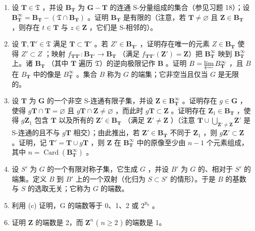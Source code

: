\begin{enumerate}
\def\labelenumi{(\alph{enumi})}
\item
  设 \(\mathbf{T} \in \mathfrak{T}\) ，并设 \(\mathbf{B}_{\mathbf{T}}\) 为 \(\mathbf{G} - \mathbf{T}\) 的连通 S-分量组成的集合（参见习题 18）；设 \(\mathbf{B}_{\mathbf{T}}^{\infty} = \mathbf{B}_{\mathbf{T}} - (\mathfrak{T} \cap \mathbf{B}_{\mathbf{T}})\) 。证明 \(\mathbf{B}_{\mathbf{T}}\) 是有限的（注意，若 \(\mathbf{T} \neq \varnothing\) 且 \(\mathbf{Z} \in \mathbf{B}_{\mathbf{T}}\) ，则存在 \(t \in \mathbf{T}\) 与 \(z \in \mathbf{Z}\) ，它们是 S-相邻的）。
\item
  设 \(\mathbf{T}, \mathbf{T}' \in \mathfrak{T}\) 满足 \(\mathbf{T} \subset \mathbf{T}'\) 。若 \(Z' \in \mathbf{B}_{\mathbf{T}'}\) ，证明存在唯一的元素 \(Z \in \mathbf{B}_{\mathbf{T}}\) 使得 \(Z' \subset Z\) ；映射 \(f_{\mathbf{T}\mathbf{T}'}: \mathbf{B}_{\mathbf{T}'} \to \mathbf{B}_{\mathbf{T}}\) （满足 \(f_{\mathbf{T}\mathbf{T}'}(\mathbf{Z}') = \mathbf{Z}\)）把 \(\mathbf{B}_{\mathbf{T}}^{\infty}\) 映到 \(\mathbf{B}_{\mathbf{T}}^{\infty}\) 上。诸 \(\mathbf{B}_{\mathbf{T}}\) （其中 \(\mathbf{T}\) 遍历 \(\mathfrak{T}\)）的逆向极限记作 \(\mathbf{B}\) 。证明 \(B = \varprojlim B_{\mathbf{T}}^{\infty}\) ，且 \(B\) 在 \(B_{\mathbf{T}}\) 中的像是 \(B_{\mathbf{T}}^{\infty}\) 。集合 \(B\) 称为 \(G\) 的端集；它非空当且仅当 \(G\) 是无限的。
\item
  设 \(\mathbf{T}\) 为 \(\mathbf{G}\) 的一个非空 S-连通有限子集，并设 \(\mathbf{Z} \in \mathbf{B}_{\mathbf{T}}^{\infty}\) 。证明存在 \(g \in \mathbf{G}\) ，使得 \(g\mathbf{T} \cap \mathbf{T} = \varnothing\) 且 \(g\mathbf{T} \cap \mathbf{Z} \neq \varnothing\) ，而此时 \(g\mathbf{T} \subset \mathbf{Z}\) 。证明存在 \(\mathbf{Z}_1 \in \mathbf{B}_{\mathbf{T}}\) ，使得 \(g\mathbf{Z}_1\) 包含 \(\mathbf{T}\) 以及所有的 \(\mathbf{Z}' \in \mathbf{B}_{\mathbf{T}}\) （满足 \(\mathbf{Z}' \neq \mathbf{Z}\) ）（注意 \(\mathbf{T} \cup \bigcup_{\mathbf{Z}' \neq \mathbf{Z}} \mathbf{Z}'\) 是 S-连通的且不与 \(g\mathbf{T}\) 相交）；由此推出，若 \(\mathbf{Z}' \in \mathbf{B}_{\mathbf{T}}\) 不同于 \(\mathbf{Z}_1\) ，则 \(g\mathbf{Z}' \subset \mathbf{Z}\) 。证明，记 \(\mathbf{T}' = \mathbf{T} \cup g\mathbf{T}\) ，则 \(\mathbf{Z}\) 在 \(\mathbf{B}_{\mathbf{T}}^{\infty}\) 中的原像至少由 \(n - 1\) 个元素组成，其中 \(n = \operatorname{Card}(\mathbf{B}_{\mathbf{T}}^{\infty})\) 。
\item
  设 \(S'\) 为 \(G\) 的一个有限对称子集，它生成 \(G\) ，并设 \(B'\) 为 \(G\) 的、相对于 \(S'\) 的端集。定义 \(B\) 到 \(B'\) 上的一个双射（化归为 \(S \subset S'\) 的情形）。于是 \(B\) 的基数与 \(S\) 的选取无关；它称为 \(G\) 的端数。
\item
  利用 (c) 证明，G 的端数等于 0、1、2 或 \(2^{\aleph_0}\) 。
\item
  证明 \(\mathbf{Z}\) 的端数是 2，而 \(\mathbf{Z}^n\) ( \(n \geqslant 2\) ) 的端数是 1。
\end{enumerate}

